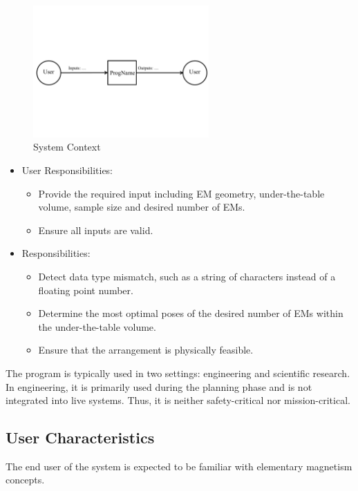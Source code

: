 \documentclass[12pt]{article}
\begin{document}
\begin{figure}[h!]
\begin{center}
 \includegraphics[width=0.6\textwidth]{SystemContextFigure}
\caption{System Context}
\label{Fig_SystemContext} 
\end{center}
\end{figure}
\begin{itemize}
\item User Responsibilities:
\begin{itemize}
\item Provide the required input including EM geometry, under-the-table volume, sample size and desired number of EMs. 
\item Ensure all inputs are valid.
\end{itemize}
\item \progname{} Responsibilities:
\begin{itemize}
\item Detect data type mismatch, such as a string of characters instead of a
  floating point number.
\item Determine the most optimal poses of the desired number of EMs within the under-the-table volume. 
\item Ensure that the arrangement is physically feasible. 
\end{itemize}
\end{itemize}

The program is typically used in two settings: engineering and scientific research. In engineering, it is primarily used during the planning phase and is not integrated into live systems. Thus, it is neither safety-critical nor mission-critical.

\subsection{User Characteristics} \label{SecUserCharacteristics}
The end user of the system is expected to be familiar with elementary magnetism concepts. 
\end{document}
